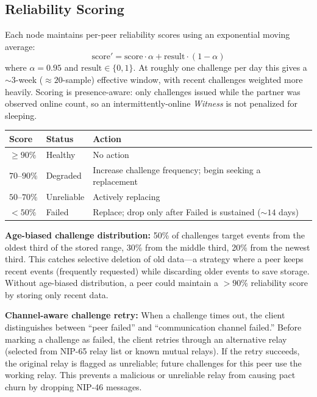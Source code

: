 \documentclass[11pt,a4paper]{article}
\begin{document}
\subsection{Reliability Scoring}

Each node maintains per-peer reliability scores using an exponential moving average:
\begin{equation}
  \text{score}' = \text{score} \cdot \alpha + \text{result} \cdot (1 - \alpha)
\end{equation}
where $\alpha = 0.95$ and $\text{result} \in \{0, 1\}$. At roughly one challenge per day this gives a ${\sim}3$-week (${\approx}20$-sample) effective window, with recent challenges weighted more heavily. Scoring is presence-aware: only challenges issued while the partner was observed online count, so an intermittently-online \emph{Witness} is not penalized for sleeping.

\begin{table}[h]
\centering
\begin{tabular}{lll}
\toprule
\textbf{Score} & \textbf{Status} & \textbf{Action} \\
\midrule
$\geq 90\%$ & Healthy & No action \\
$70$--$90\%$ & Degraded & Increase challenge frequency; begin seeking a replacement \\
$50$--$70\%$ & Unreliable & Actively replacing \\
$< 50\%$ & Failed & Replace; drop only after Failed is sustained (${\sim}14$ days) \\
\bottomrule
\end{tabular}
\end{table}

\textbf{Age-biased challenge distribution:} 50\% of challenges target events from the oldest third of the stored range, 30\% from the middle third, 20\% from the newest third. This catches selective deletion of old data---a strategy where a peer keeps recent events (frequently requested) while discarding older events to save storage. Without age-biased distribution, a peer could maintain a ${>}90\%$ reliability score by storing only recent data.

\textbf{Channel-aware challenge retry:} When a challenge times out, the client distinguishes between ``peer failed'' and ``communication channel failed.'' Before marking a challenge as failed, the client retries through an alternative relay (selected from NIP-65 relay list or known mutual relays). If the retry succeeds, the original relay is flagged as unreliable; future challenges for this peer use the working relay. This prevents a malicious or unreliable relay from causing pact churn by dropping NIP-46 messages.
\end{document}
